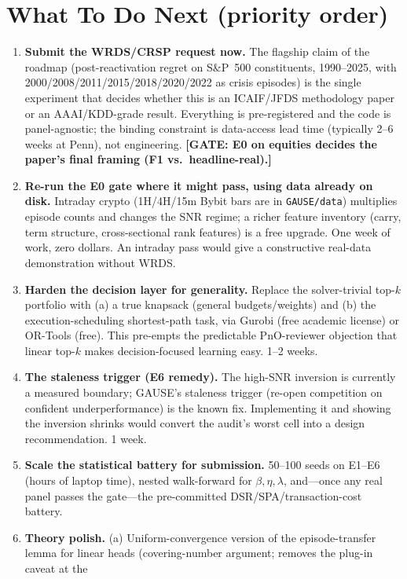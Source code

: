 \documentclass[11pt]{article}
\newcommand{\gate}[1]{\textcolor{red!70!black}{\textbf{[GATE: #1]}}}
\begin{document}
\section{What To Do Next (priority order)}
\begin{enumerate}
  \item \textbf{Submit the WRDS/CRSP request now.} The flagship claim of the roadmap
  (post-reactivation regret on S\&P~500 constituents, 1990--2025, with
  2000/2008/2011/2015/2018/2020/2022 as crisis episodes) is the single experiment that
  decides whether this is an ICAIF/JFDS methodology paper or an AAAI/KDD-grade
  result. Everything is pre-registered and the code is panel-agnostic; the binding
  constraint is data-access lead time (typically 2--6 weeks at Penn), not engineering.
  \gate{E0 on equities decides the paper's final framing (F1 vs.\ headline-real).}
  \item \textbf{Re-run the E0 gate where it might pass, using data already on disk.}
  Intraday crypto (1H/4H/15m Bybit bars are in \texttt{GAUSE/data}) multiplies episode
  counts and changes the SNR regime; a richer feature inventory (carry, term structure,
  cross-sectional rank features) is a free upgrade. One week of work, zero dollars.
  An intraday pass would give a constructive real-data demonstration without WRDS.
  \item \textbf{Harden the decision layer for generality.} Replace the solver-trivial
  top-$k$ portfolio with (a) a true knapsack (general budgets/weights) and (b) the
  execution-scheduling shortest-path task, via Gurobi (free academic license) or
  OR-Tools (free). This pre-empts the predictable PnO-reviewer objection that linear
  top-$k$ makes decision-focused learning easy. 1--2 weeks.
  \item \textbf{The staleness trigger (E6 remedy).} The high-SNR inversion is currently
  a measured boundary; GAUSE's staleness trigger (re-open competition on confident
  underperformance) is the known fix. Implementing it and showing the inversion
  shrinks would convert the audit's worst cell into a design recommendation. 1 week.
  \item \textbf{Scale the statistical battery for submission.} 50--100 seeds on E1--E6
  (hours of laptop time), nested walk-forward for $\beta, \eta, \lambda$, and---once
  any real panel passes the gate---the pre-committed DSR/SPA/transaction-cost battery.
  \item \textbf{Theory polish.} (a) Uniform-convergence version of the episode-transfer
  lemma for linear heads (covering-number argument; removes the plug-in caveat at the

\end{enumerate}
\end{document}
